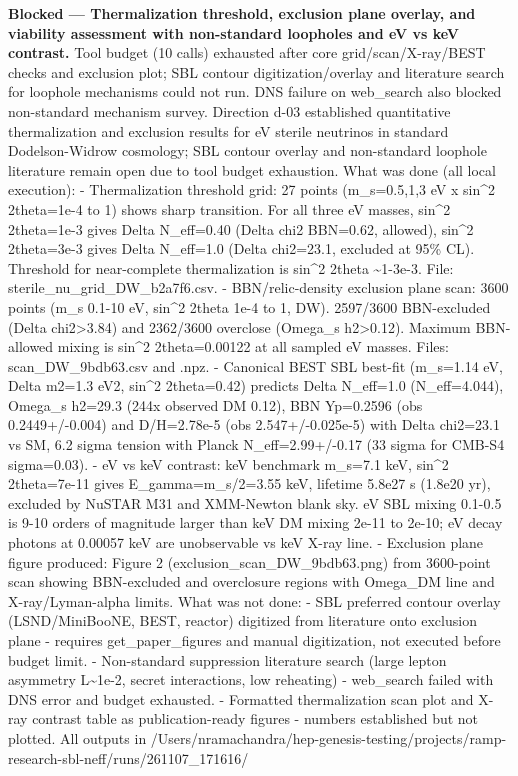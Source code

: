 \documentclass[11pt,a4paper]{article}
\begin{document}
\textbf{Blocked --- Thermalization threshold, exclusion plane overlay, and viability assessment with non-standard loopholes and eV vs keV contrast.} Tool budget (10 calls) exhausted after core grid/scan/X-ray/BEST checks and exclusion plot; SBL contour digitization/overlay and literature search for loophole mechanisms could not run. DNS failure on web\_search also blocked non-standard mechanism survey. Direction d-03 established quantitative thermalization and exclusion results for eV sterile neutrinos in standard Dodelson-Widrow cosmology; SBL contour overlay and non-standard loophole literature remain open due to tool budget exhaustion. What was done (all local execution): - Thermalization threshold grid: 27 points (m\_s=0.5,1,3 eV x sin\textasciicircum{}2 2theta=1e-4 to 1) shows sharp transition. For all three eV masses, sin\textasciicircum{}2 2theta=1e-3 gives Delta N\_eff=0.40 (Delta chi2 BBN=0.62, allowed), sin\textasciicircum{}2 2theta=3e-3 gives Delta N\_eff=1.0 (Delta chi2=23.1, excluded at 95\% CL). Threshold for near-complete thermalization is sin\textasciicircum{}2 2theta \textasciitilde{}1-3e-3. File: sterile\_nu\_grid\_DW\_b2a7f6.csv. - BBN/relic-density exclusion plane scan: 3600 points (m\_s 0.1-10 eV, sin\textasciicircum{}2 2theta 1e-4 to 1, DW). 2597/3600 BBN-excluded (Delta chi2\textgreater{}3.84) and 2362/3600 overclose (Omega\_s h2\textgreater{}0.12). Maximum BBN-allowed mixing is sin\textasciicircum{}2 2theta=0.00122 at all sampled eV masses. Files: scan\_DW\_9bdb63.csv and .npz. - Canonical BEST SBL best-fit (m\_s=1.14 eV, Delta m2=1.3 eV2, sin\textasciicircum{}2 2theta=0.42) predicts Delta N\_eff=1.0 (N\_eff=4.044), Omega\_s h2=29.3 (244x observed DM 0.12), BBN Yp=0.2596 (obs 0.2449+/-0.004) and D/H=2.78e-5 (obs 2.547+/-0.025e-5) with Delta chi2=23.1 vs SM, 6.2 sigma tension with Planck N\_eff=2.99+/-0.17 (33 sigma for CMB-S4 sigma=0.03). - eV vs keV contrast: keV benchmark m\_s=7.1 keV, sin\textasciicircum{}2 2theta=7e-11 gives E\_gamma=m\_s/2=3.55 keV, lifetime 5.8e27 s (1.8e20 yr), excluded by NuSTAR M31 and XMM-Newton blank sky. eV SBL mixing 0.1-0.5 is 9-10 orders of magnitude larger than keV DM mixing 2e-11 to 2e-10; eV decay photons at 0.00057 keV are unobservable vs keV X-ray line. - Exclusion plane figure produced: Figure 2 (exclusion\_scan\_DW\_9bdb63.png) from 3600-point scan showing BBN-excluded and overclosure regions with Omega\_DM line and X-ray/Lyman-alpha limits. What was not done: - SBL preferred contour overlay (LSND/MiniBooNE, BEST, reactor) digitized from literature onto exclusion plane - requires get\_paper\_figures and manual digitization, not executed before budget limit. - Non-standard suppression literature search (large lepton asymmetry L\textasciitilde{}1e-2, secret interactions, low reheating) - web\_search failed with DNS error and budget exhausted. - Formatted thermalization scan plot and X-ray contrast table as publication-ready figures - numbers established but not plotted. All outputs in /Users/nramachandra/hep-genesis-testing/projects/ramp-research-sbl-neff/runs/261107\_171616/
\end{document}
